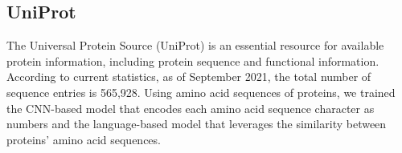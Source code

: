 \subsection{UniProt}
The Universal Protein Source (UniProt) \cite{uniprot2021uniprot} is an essential resource for available protein information, including protein sequence and functional information. According to current statistics, as of September 2021, the total number of sequence entries is 565,928. Using amino acid sequences of proteins, we trained the CNN-based model that encodes each amino acid sequence character as numbers and the language-based model that leverages the similarity between proteins' amino acid sequences.

